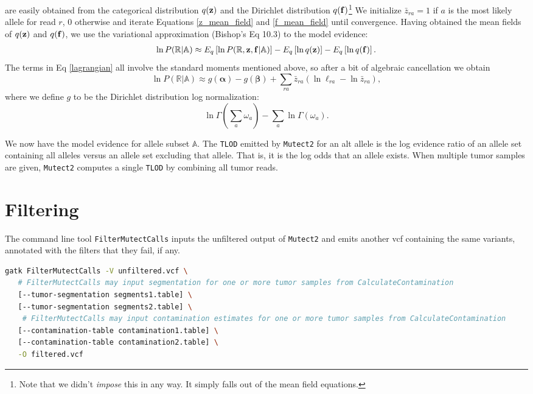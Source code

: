 \documentclass[nofootinbib,amssymb,amsmath]{revtex4}
\newcommand{\vf}{{\bf f}}
\newcommand{\vz}{{\bf z}}
\newcommand{\valpha}{{\bm{\alpha}}}
\newcommand{\vbeta}{{\bm{\beta}}}
\newcommand{\code}[1]{\texttt{#1}}
\begin{document}
are easily obtained from the categorical distribution $q(\vz)$ and the Dirichlet distribution $q(\vf)$\footnote{Note that we didn't \textit{impose} this in any way.  It simply falls out of the mean field equations.}  We initialize $\bar{z}_{ra} = 1$ if $a$ is the most likely allele for read $r$, 0 otherwise and iterate Equations \ref{z_mean_field} and \ref{f_mean_field} until convergence. Having obtained the mean fields of $q(\vz)$ and $q(\vf)$, we use the variational approximation (Bishop's Eq 10.3) to the model evidence:
\begin{align}
\ln P(\mathbb{R} | \mathbb{A}) \approx  E_q \left[ \ln P(\mathbb{R}, \vz, \vf | \mathbb{A}) \right] - E_q \left[ \ln q(\vz) \right] - E_q \left[ \ln q(\vf) \right]. \label{lagrangian}
\end{align}
The terms in Eq \ref{lagrangian} all involve the standard moments mentioned above, so after a bit of algebraic cancellation we obtain
\begin{equation}
\ln P(\mathbb{R} | \mathbb{A}) \approx g(\valpha) - g(\vbeta) +  \sum_{ra} \bar{z}_{ra} \left( \ln \ell_{ra} - \ln \bar{z}_{ra} \right),
\label{tumor-lod}
\end{equation}
where we define $g$ to be the Dirichlet distribution log normalization:
\begin{equation}
\ln \Gamma(\sum_a \omega_a) - \sum_a \ln \Gamma(\omega_a).
\end{equation}

We now have the model evidence for allele subset $\mathbb{A}$. The \code{TLOD} emitted by \code{Mutect2} for an alt allele is the log evidence ratio of an allele set containing all alleles versus an allele set excluding that allele.  That is, it is the log odds that an allele exists.  When multiple tumor samples are given, \code{Mutect2} computes a single \code{TLOD} by combining all tumor reads.

\section{Filtering}
The command line tool \code{FilterMutectCalls} inputs the unfiltered output of \code{Mutect2} and emits another vcf containing the same variants, annotated with the filters that they fail, if any.

\begin{lstlisting}[language=bash,caption={Mutect2 command}, label={cmd-mutect2}]
gatk FilterMutectCalls -V unfiltered.vcf \
   # FilterMutectCalls may input segmentation for one or more tumor samples from CalculateContamination
   [--tumor-segmentation segments1.table] \
   [--tumor-segmentation segments2.table] \
    # FilterMutectCalls may input contamination estimates for one or more tumor samples from CalculateContamination
   [--contamination-table contamination1.table] \
   [--contamination-table contamination2.table] \
   -O filtered.vcf
\end{lstlisting}
\end{document}
